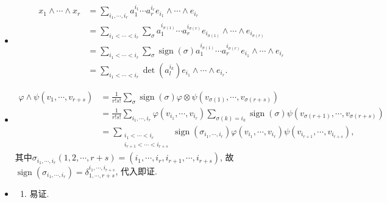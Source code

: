 \begin{itemize}
	
	\item[42.] \begin{align*}
		x_1\wedge \cdots \wedge x_r
		&=\sum\limits_{i_1,\cdots,i_r}a^{i_1}_1\cdots a^{i_r}_re_{i_1}\wedge\cdots\wedge e_{i_r}\\
		&=\sum\limits_{i_1<\cdots<i_r}\sum\limits_{\sigma}a^{i_{\sigma(1)}}_1\cdots a^{i_{\sigma(r)}}_re_{i_{\sigma(1)}}\wedge\cdots\wedge e_{i_{\sigma(r)}}\\
		&=\sum\limits_{i_1<\cdots<i_r}\sum\limits_{\sigma}\operatorname{sign}(\sigma)a^{i_{\sigma(1)}}_1\cdots a^{i_{\sigma(r)}}_re_{i_1}\wedge\cdots\wedge e_{i_r}\\
		&=\sum\limits_{i_1<\cdots<i_r}\det(a_l^{i_k})e_{i_1}\wedge \cdots \wedge e_{i_r}.
		\end{align*}
	
	\item[43.] \begin{align*}
			\varphi \wedge \psi(v_1,\cdots,v_{r+s})
			&=\frac{1}{r!s!} \sum\limits_{\sigma}\operatorname{sign}(\sigma)\varphi \otimes \psi(v_{\sigma(1)},\cdots,v_{\sigma(r+s)})\\
			&=\frac{1}{r!s!} \sum\limits_{i_1,\cdots,i_r}\varphi(v_{i_1},\cdots,v_{i_r})\sum\limits_{\sigma(k)=i_k}\operatorname{sign}(\sigma)\psi(v_{\sigma(r+1)},\cdots,v_{\sigma(r+s)})\\
			&=\sum_{\substack{i_1<\cdots<i_r\\ i_{r+1}<\cdots<i_{r+s}}}\operatorname{sign}(\sigma_{i_1,\cdots,i_r})\varphi(v_{i_1},\cdots,v_{i_r})\psi(v_{i_{r+1}},\cdots,v_{i_{r+s}}),
		\end{align*}
	其中$\sigma_{i_1,\cdots,i_r}(1,2,\cdots,r+s)=(i_1,\cdots,i_r,i_{r+1},\cdots,i_{r+s})$, 
    故$\operatorname{sign}(\sigma_{i_1,\cdots,i_r})=\delta_{1,\cdots,r+s}^{i_1,\cdots,i_{r+s}}$, 代入即证.
	
	\item[44.] 
	\begin{enumerate}
        \item[(1)]
	易证.
	

\end{enumerate}
\end{itemize}
